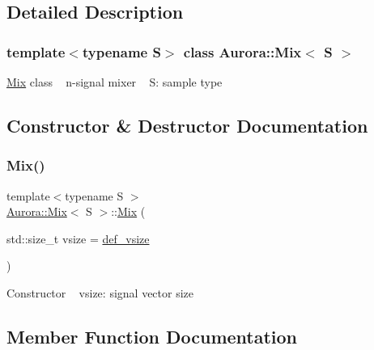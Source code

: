\subsection{Detailed Description}
\subsubsection*{template$<$typename S$>$\newline
class Aurora\+::\+Mix$<$ S $>$}

\hyperlink{class_aurora_1_1_mix}{Mix} class ~\newline
n-\/signal mixer ~\newline
S\+: sample type 

\subsection{Constructor \& Destructor Documentation}
\mbox{\label{class_aurora_1_1_mix_aa3b9e9322e58a0b47d4ed3a12fbe2b94}} 
\subsubsection{\texorpdfstring{Mix()}{Mix()}}
{\footnotesize\ttfamily template$<$typename S $>$ \\
\hyperlink{class_aurora_1_1_mix}{Aurora\+::\+Mix}$<$ S $>$\+::\hyperlink{class_aurora_1_1_mix}{Mix} (\begin{DoxyParamCaption}\item[{std\+::size\+\_\+t}]{vsize = {\ttfamily \hyperlink{namespace_aurora_afaaddf667a06e7ce23c667a8b7295263}{def\+\_\+vsize}} }\end{DoxyParamCaption})\hspace{0.3cm}{\ttfamily [inline]}}

Constructor ~\newline
vsize\+: signal vector size 

\subsection{Member Function Documentation}
\mbox{\label{class_aurora_1_1_mix_ad9ea4686dddb338fcb03519e4e385a1d}} 
